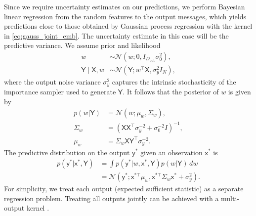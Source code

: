 \documentclass[english]{article}
\theoremstyle{plain}
\theoremstyle{plain}
\begin{document}
Since we require uncertainty estimates on our predictions,
we perform Bayesian linear regression from the random features to the output messages,
which yields predictions close to those obtained by Gaussian process regression
with the kernel in \eqref{eq:gauss_joint_emb}.
The uncertainty estimate in this case will be the predictive 
variance.
We assume prior and likelihood
\begin{align}
w & \sim\mathcal{N}\left(w;0,I_{D_\mathrm{out}}\sigma_{0}^{2}\right), \\
\mathsf{Y} \mid \mathsf{X},w & \sim\mathcal{N}\left(\mathsf{Y};w^{\top} \mathsf{X},\sigma_{y}^{2}I_{N}\right),
\end{align}
%
where the output noise variance $\sigma_{y}^{2}$ captures the intrinsic
stochasticity of the importance sampler used to generate $\mathsf{Y}$. It
follows that the posterior of $w$ is given by \citep{Bishop2006}
%
\begin{align}
p(w | \mathsf{Y}) & =\mathcal{N}(w;\mu_{w},\Sigma_{w}), \\
\Sigma_{w} & = \left( \mathsf{X} \mathsf{X}^{\top}\sigma_{y}^{-2}+\sigma_{0}^{-2}I \right)^{-1}, \\
\mu_{w} & =\Sigma_{w} \mathsf{X} \mathsf{Y}^{\top}\sigma_{y}^{-2}.
\end{align}
The predictive distribution on the output $\mathsf{y}^{*}$ given an 
observation $\mathsf{x}^{*}$ is
%
\begin{align}
p(\mathsf{y}^{*}| \mathsf{x}^{*}, \mathsf{Y}) & =\int  
 p(\mathsf{y}^{*}|w, \mathsf{x}^{*}, \mathsf{Y}) p(w|\mathsf{Y}) \, dw\\
 & =\mathcal{N}\left(\mathsf{y}^{*}; \mathsf{x}^{*\top}\mu_{w}, \mathsf{x}^{*\top}\Sigma_{w} \mathsf{x}^{*}+\sigma_{y}^{2}\right).
\end{align}
%
%
For simplicity, we treat each output (expected sufficient statistic) as a separate regression problem. 
Treating all outputs jointly can be achieved with a multi-output kernel \citep{Alvarez2011}.
\end{document}
